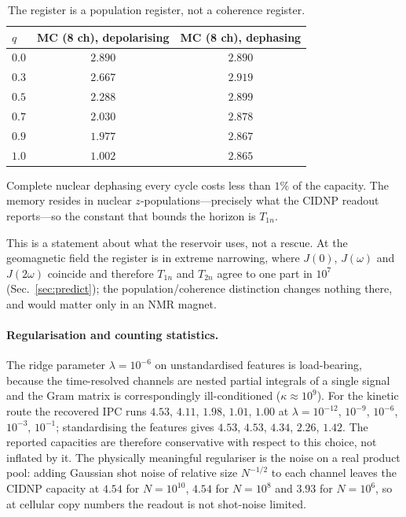 \documentclass[aps,prx,reprint,superscriptaddress,nofootinbib,floatfix]{revtex4-2}
\begin{document}
\begin{table}[H]
\caption{\label{tab:chan}The register is a population register, not a coherence
register.}
\begin{ruledtabular}
\begin{tabular}{lcc}
$q$ & MC (8 ch), depolarising & MC (8 ch), dephasing \\
\hline
$0.0$ & $2.890$ & $2.890$ \\
$0.3$ & $2.667$ & $2.919$ \\
$0.5$ & $2.288$ & $2.899$ \\
$0.7$ & $2.030$ & $2.878$ \\
$0.9$ & $1.977$ & $2.867$ \\
$1.0$ & $1.002$ & $2.865$ \\
\end{tabular}
\end{ruledtabular}
\end{table}

Complete nuclear dephasing every cycle costs less than $1\%$ of the capacity. The
memory resides in nuclear $z$-populations---precisely what the CIDNP readout
reports---so the constant that bounds the horizon is $T_{1n}$.

This is a statement about what the reservoir uses, not a rescue. At the
geomagnetic field the register is in extreme narrowing, where
$J(0)$, $J(\omega)$ and $J(2\omega)$ coincide and therefore $T_{1n}$ and $T_{2n}$
agree to one part in $10^{7}$
(Sec.~\ref{sec:predict}); the population/coherence distinction changes nothing
there, and would matter only in an NMR magnet.

\paragraph*{Regularisation and counting statistics.} The ridge parameter
$\lambda=10^{-6}$ on unstandardised features is load-bearing, because the
time-resolved channels are nested partial integrals of a single signal and the
Gram matrix is correspondingly ill-conditioned ($\kappa\approx10^9$). For the
kinetic route the recovered IPC runs $4.53$, $4.11$, $1.98$, $1.01$, $1.00$ at
$\lambda=10^{-12}$, $10^{-9}$, $10^{-6}$, $10^{-3}$, $10^{-1}$; standardising the
features gives $4.53$, $4.53$, $4.34$, $2.26$, $1.42$. The reported capacities are
therefore conservative with respect to this choice, not inflated by it. The
physically meaningful regulariser is the noise on a real product pool: adding
Gaussian shot noise of relative size $N^{-1/2}$ to each channel leaves the CIDNP
capacity at $4.54$ for $N=10^{10}$, $4.54$ for $N=10^{8}$ and $3.93$ for
$N=10^{6}$, so at cellular copy numbers the readout is not shot-noise limited.
\end{document}
